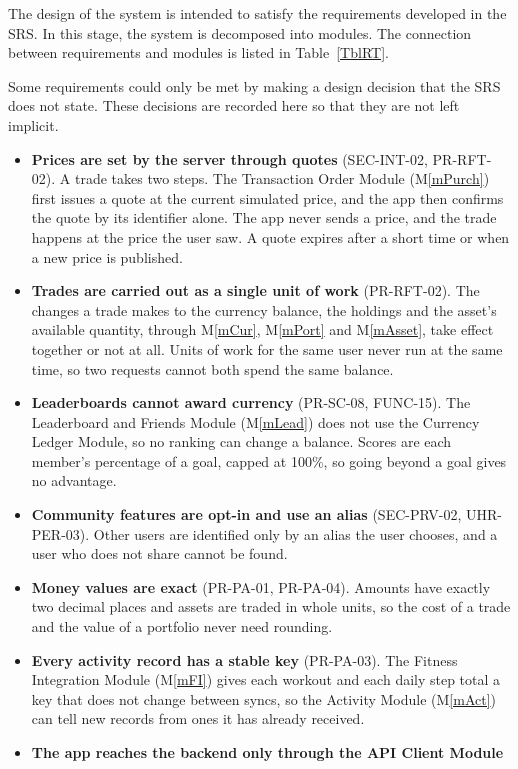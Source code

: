 \documentclass[12pt, titlepage]{article}
\newcommand{\mref}[1]{M\ref{#1}}
\begin{document}
The design of the system is intended to satisfy the requirements developed in
the SRS. In this stage, the system is decomposed into modules. The connection
between requirements and modules is listed in Table~\ref{TblRT}.

Some requirements could only be met by making a design decision that the SRS
does not state. These decisions are recorded here so that they are not left
implicit.

\begin{itemize}
\item \textbf{Prices are set by the server through quotes} (SEC-INT-02,
  PR-RFT-02). A trade takes two steps. The Transaction Order Module
  (\mref{mPurch}) first issues a quote at the current simulated price, and the
  app then confirms the quote by its identifier alone. The app never sends a
  price, and the trade happens at the price the user saw. A quote expires
  after a short time or when a new price is published.
\item \textbf{Trades are carried out as a single unit of work} (PR-RFT-02). The
  changes a trade makes to the currency balance, the holdings and the asset's
  available quantity, through \mref{mCur}, \mref{mPort} and \mref{mAsset}, take
  effect together or not at all. Units of work for the same user never run at
  the same time, so two requests cannot both spend the same balance.
\item \textbf{Leaderboards cannot award currency} (PR-SC-08, FUNC-15). The
  Leaderboard and Friends Module (\mref{mLead}) does not use the Currency
  Ledger Module, so no ranking can change a balance. Scores are each member's
  percentage of a goal, capped at 100\%, so going beyond a goal gives no
  advantage.
\item \textbf{Community features are opt-in and use an alias} (SEC-PRV-02,
  UHR-PER-03). Other users are identified only by an alias the user chooses,
  and a user who does not share cannot be found.
\item \textbf{Money values are exact} (PR-PA-01, PR-PA-04). Amounts have
  exactly two decimal places and assets are traded in whole units, so the cost
  of a trade and the value of a portfolio never need rounding.
\item \textbf{Every activity record has a stable key} (PR-PA-03). The Fitness
  Integration Module (\mref{mFI}) gives each workout and each daily step total
  a key that does not change between syncs, so the Activity Module
  (\mref{mAct}) can tell new records from ones it has already received.
\item \textbf{The app reaches the backend only through the API Client Module}

\end{itemize}
\end{document}
